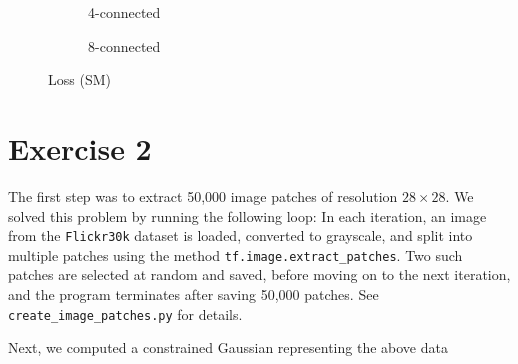 \documentclass[a4paper]{article}
\theoremstyle{definition}
\theoremstyle{plain}
\begin{document}
\begin{figure}[H]
	\centering
	\begin{subfigure}[b]{0.49\textwidth}
		
		\caption{4-connected}
	\end{subfigure}
	\hfill
	\begin{subfigure}[b]{0.49\textwidth}
		
		\caption{8-connected}
	\end{subfigure}
	\caption{Loss (SM)}
	\label{loss_SM_fig}
\end{figure}




\section*{\center Exercise 2}

The first step was to extract 50,000 image patches of resolution $28\times 28$. We solved this problem by running the following loop: In each iteration, an image from the \texttt{Flickr30k} dataset is loaded, converted to grayscale, and split into multiple patches using the method \texttt{tf.image.extract\_patches}. Two such patches are selected at random and saved, before moving on to the next iteration, and the program terminates after saving 50,000 patches. See \texttt{create\_image\_patches.py} for details.

Next, we computed a constrained Gaussian representing the above data \lipsum[2]
\end{document}
